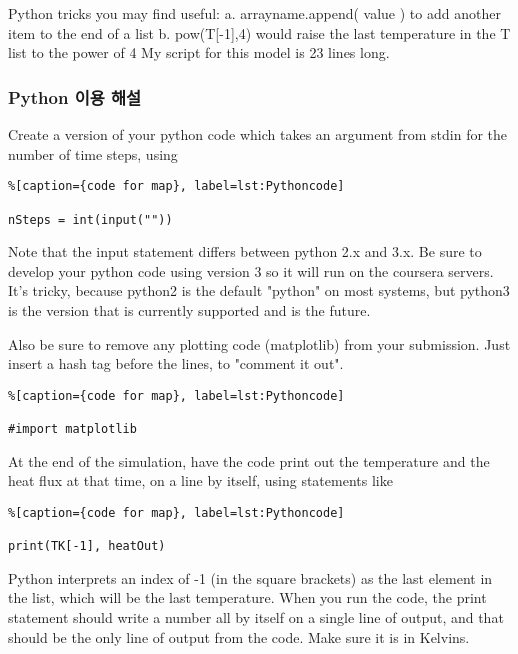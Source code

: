{\begin{enumerate}
Python tricks you may find useful:
a. arrayname.append( value ) to add another item to the end of a list
b. pow(T[-1],4) would raise the last temperature in the T list to the power of 4
My script for this model is 23 lines long.


\end{enumerate}


\subsubsection{Python 이용 해설}\index{}

Create a version of your python code which takes an argument from stdin for the number of time steps, using

\begin{lstlisting}%[caption={code for map}, label=lst:Pythoncode]

nSteps = int(input(""))
\end{lstlisting}

Note that the input statement differs between python 2.x and 3.x. Be sure to develop your python code using version 3 so it will run on the coursera servers. It's tricky, because python2 is the default "python" on most systems, but python3 is the version that is currently supported and is the future.

Also be sure to remove any plotting code (matplotlib) from your submission. Just insert a hash tag before the lines, to "comment it out".

\begin{lstlisting}%[caption={code for map}, label=lst:Pythoncode]

#import matplotlib
\end{lstlisting}


At the end of the simulation, have the code print out the temperature and the heat flux at that time, on a line by itself, using statements like

\begin{lstlisting}%[caption={code for map}, label=lst:Pythoncode]

print(TK[-1], heatOut)
\end{lstlisting}

Python interprets an index of -1 (in the square brackets) as the last element in the list, which will be the last temperature. When you run the code, the print statement should write a number all by itself on a single line of output, and that should be the only line of output from the code. Make sure it is in Kelvins.

}
